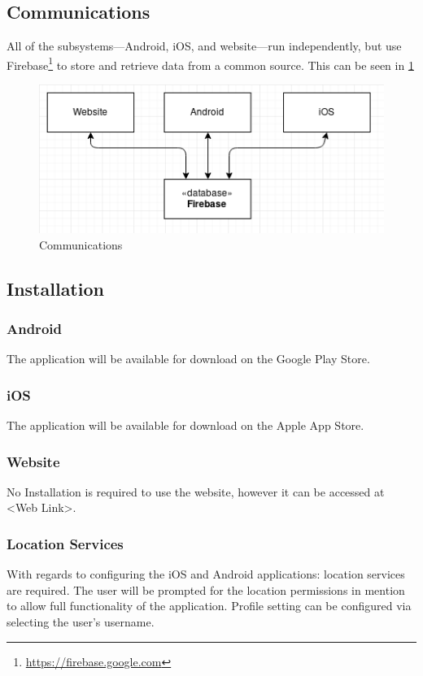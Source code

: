 \documentclass[11pt]{article}
\begin{document}
\subsection{Communications}
All of the subsystems---Android, iOS, and website---run independently, but use Firebase\footnote{\url{https://firebase.google.com}} to store and retrieve data from a common source. This can be seen in \ref{Communications}

\begin{figure}
 \centering
 \includegraphics[width=12cm, keepaspectratio]{Images/webDiagramCommunications.png}
 \caption{Communications}
 \label{Communications}
\end{figure}

\subsection{Installation}
\subsubsection{Android}
The application will be available for download on the Google Play Store.
\subsubsection{iOS}
The application will be available for download on the Apple App Store.
\subsubsection{Website}
No Installation is required to use the website, however it can be accessed at <Web Link>.
\subsubsection{Location Services}
With regards to configuring the iOS and Android applications: location services are required. The user will be prompted for the location permissions in mention to allow full functionality of the application. Profile setting can be configured via selecting the user's username.
\end{document}

